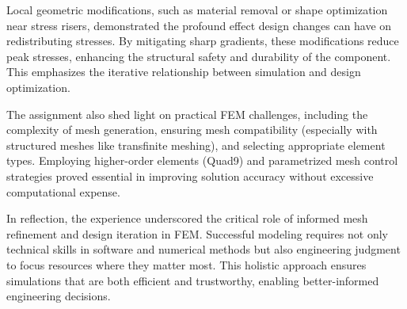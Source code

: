 Local geometric modifications, such as material removal or shape optimization near stress risers, demonstrated the profound effect design changes can have on redistributing stresses. By mitigating sharp gradients, these modifications reduce peak stresses, enhancing the structural safety and durability of the component. This emphasizes the iterative relationship between simulation and design optimization.

The assignment also shed light on practical FEM challenges, including the complexity of mesh generation, ensuring mesh compatibility (especially with structured meshes like transfinite meshing), and selecting appropriate element types. Employing higher-order elements (Quad9) and parametrized mesh control strategies proved essential in improving solution accuracy without excessive computational expense.

In reflection, the experience underscored the critical role of informed mesh refinement and design iteration in FEM. Successful modeling requires not only technical skills in software and numerical methods but also engineering judgment to focus resources where they matter most. This holistic approach ensures simulations that are both efficient and trustworthy, enabling better-informed engineering decisions.